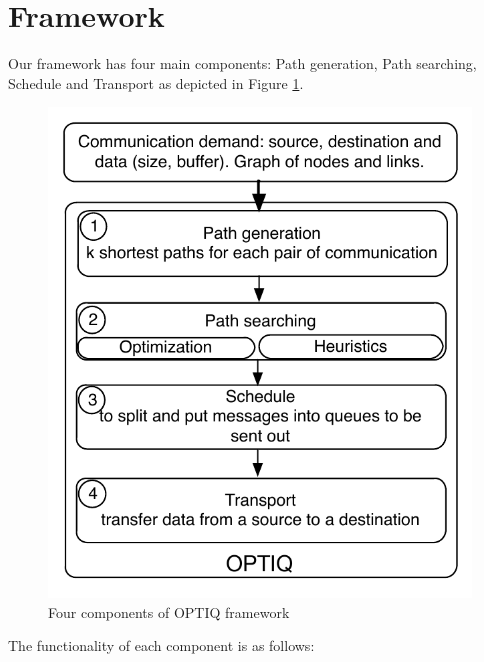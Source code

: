\section{Framework}
\label{sec:framework}

Our framework has four main components: Path generation, Path searching, Schedule and Transport as depicted in Figure \ref{fig:framework}. 
\begin{figure}[!htb]
\vspace{-0.15in}
\centering
\includegraphics[scale=0.5]{figures/framework.pdf}
\vspace{-0.15in}
\caption{\small Four components of OPTIQ framework}
\vspace{-0.15in}
\label{fig:framework}
\end{figure}
The functionality of each component is as follows:

